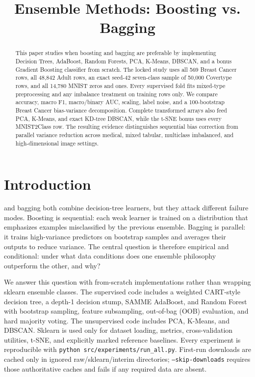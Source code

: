 \documentclass[conference]{IEEEtran}
\title{Ensemble Methods: Boosting vs. Bagging}
\author{
\IEEEauthorblockN{Shahin Safarli, Gulnisa Abdurahmanli, Jeyhuna Sevdiyeva, Seljan Khasiyeva, Suleyman Allahverdiyev}
\IEEEauthorblockA{AI Academy, National AI Center\\
Machine Learning, Spring 2026}
}
\begin{document}
\maketitle

\begin{abstract}
This paper studies when boosting and bagging are preferable by implementing
Decision Trees, AdaBoost, Random Forests, PCA, K-Means, DBSCAN, and a bonus
Gradient Boosting classifier from scratch. The locked study uses all 569
Breast Cancer rows, all 48,842 Adult rows, an exact seed-42 seven-class sample
of 50,000 Covertype rows, and all 14,780 MNIST zeros and ones. Every supervised
fold fits mixed-type preprocessing and any imbalance treatment on training
rows only. We compare accuracy, macro F1, macro/binary AUC, scaling, label
noise, and a 100-bootstrap Breast Cancer bias-variance decomposition. Complete
transformed arrays also feed PCA, K-Means, and exact KD-tree DBSCAN, while the
t-SNE bonus uses every MNIST2Class row. The resulting evidence distinguishes
sequential bias correction from parallel variance reduction across medical,
mixed tabular, multiclass imbalanced, and high-dimensional image settings.
\end{abstract}

\section{Introduction}
 and bagging both combine decision-tree learners, but
they attack different failure modes. Boosting is sequential: each weak learner
is trained on a distribution that emphasizes examples misclassified by the
previous ensemble. Bagging is parallel: it trains high-variance predictors on
bootstrap samples and averages their outputs to reduce variance. The central
question is therefore empirical and conditional: under what data conditions
does one ensemble philosophy outperform the other, and why?

We answer this question with from-scratch implementations rather than
wrapping sklearn ensemble classes. The supervised code includes a weighted
CART-style decision tree, a depth-1 decision stump, SAMME AdaBoost, and
Random Forest with bootstrap sampling, feature subsampling, out-of-bag (OOB)
evaluation, and hard majority voting. The unsupervised code includes PCA,
K-Means, and DBSCAN. Sklearn is used only for dataset loading, metrics,
cross-validation utilities, t-SNE, and explicitly marked reference baselines.
Every experiment is reproducible with
\texttt{python src/experiments/run\_all.py}. First-run downloads are cached
only in ignored raw/sklearn/interim directories; \texttt{--skip-downloads}
requires those authoritative caches and fails if any required data are absent.
\end{document}
